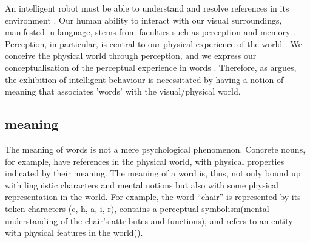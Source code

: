\documentclass[11pt, a4paper]{article}
\begin{document}
An intelligent robot must be able to understand and resolve references in its environment \citep{russell1995artificial}.
Our human ability to interact with our visual surroundings, manifested in language, stems from faculties such as perception and memory \citep{regier1996human}.
Perception, in particular, is central to our physical experience of the world \citep{barsalou1999perceptual}.
We conceive the physical world through perception, and we express our %
conceptualisation of the perceptual experience in words \citep{lakoff2008metaphors}.
Therefore, as \citet{nilsson2007physical} argues, the exhibition of intelligent behaviour is necessitated by having a notion of meaning that associates 'words' with the visual/physical world.

\subsection{meaning}



The meaning of words is not a mere psychological phenomenon. Concrete nouns, for example, have references in the physical world, with physical properties indicated by their meaning. The meaning of a word is, thus, not only bound up with linguistic characters and mental notions but also with some physical representation in the world. For example, the word ``chair'' is represented by its token-characters (c, h, a, i, r), contains a perceptual symbolism(mental understanding of the chair's attributes and functions), and refers to an entity with physical features in the world(\cite{mooney}).
\end{document}
